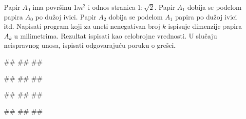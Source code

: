 \begin{Exercise}[difficulty=1, label=PET_33] 
Papir $A_0$ ima površinu 1$m^2$ i odnos stranica
$1:\sqrt{2}$. Papir $A_1$ dobija se podelom papira $A_0$ po dužoj
ivici. Papir $A_2$ dobija se podelom $A_1$ papira po dužoj ivici
itd. Napisati program koji za uneti nenegativan broj $k$ ispisuje 
dimenzije papira $A_k$ u milimetrima. Rezultat ispisati kao celobrojne
vrednosti. U slučaju neispravnog unosa, ispisati odgovarajuću poruku o grešci.
  
\begin{miditest}
\begin{upotreba}{1}
#\naslovInt#
##
##
\end{upotreba}
\end{miditest}
\begin{miditest}
\begin{upotreba}{2}
#\naslovInt#
##
##
\end{upotreba}
\end{miditest}

\begin{miditest}
\begin{upotreba}{3}
#\naslovInt#
##
##
\end{upotreba}
\end{miditest}
\begin{miditest}
\begin{upotreba}{4}
#\naslovInt#
##
##
\end{upotreba}
\end{miditest}
\end{Exercise}
\ifresenja
\begin{Answer}[ref=PET_33]
\end{Answer}
\fi




